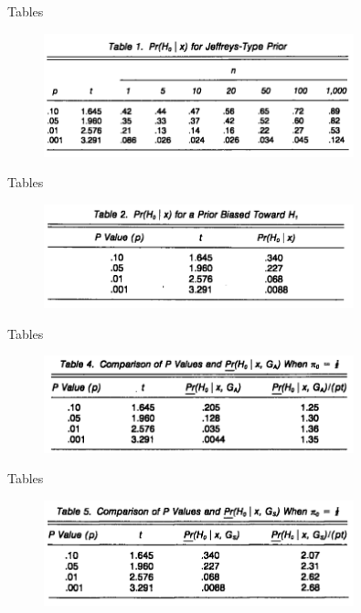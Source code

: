 \begin{frame}{Tables}

\begin{figure}[t]
\includegraphics[width=0.8\textwidth]{figures/table1}
\centering
\end{figure}

\end{frame}


\begin{frame}{Tables}

\begin{figure}[t]
\includegraphics[width=0.8\textwidth]{figures/table2}
\centering
\end{figure}

\end{frame}



\begin{frame}{Tables}

\begin{figure}[t]
\includegraphics[width=0.8\textwidth]{figures/table4}
\centering
\end{figure}

\end{frame}



\begin{frame}{Tables}

\begin{figure}[t]
\includegraphics[width=0.8\textwidth]{figures/table5}
\centering
\end{figure}

\end{frame}



